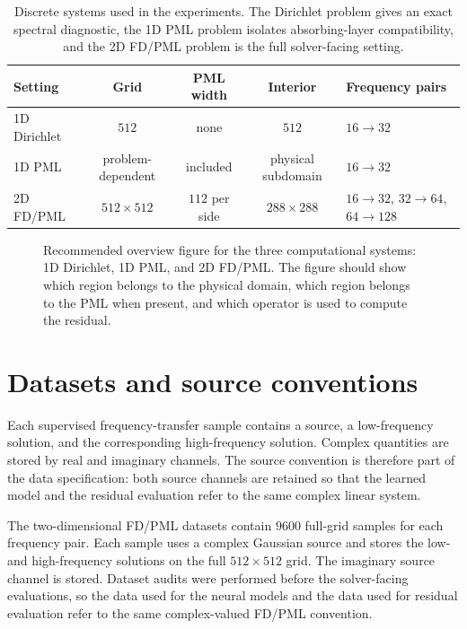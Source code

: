 \begin{table}[htbp]
\centering
\caption{Discrete systems used in the experiments. The Dirichlet problem gives
an exact spectral diagnostic, the 1D PML problem isolates absorbing-layer
compatibility, and the 2D FD/PML problem is the full solver-facing setting.}
\label{tab:setup-systems}
\begin{tabular}{lcccl}
\toprule
Setting & Grid & PML width & Interior & Frequency pairs \\
\midrule
1D Dirichlet & $512$ & none & $512$ & $16\to32$ \\
1D PML & problem-dependent & included & physical subdomain & $16\to32$ \\
2D FD/PML & $512\times512$ & $112$ per side & $288\times288$ &
$16\to32$, $32\to64$, $64\to128$ \\
\bottomrule
\end{tabular}
\end{table}

\begin{figure}[htbp]
    \centering
    \caption{Recommended overview figure for the three computational systems:
    1D Dirichlet, 1D PML, and 2D FD/PML. The figure should show which region
    belongs to the physical domain, which region belongs to the PML when
    present, and which operator is used to compute the residual.}
    \label{fig:setup-discrete-systems-overview}
\end{figure}

\section{Datasets and source conventions}
\label{sec:setup-datasets}

Each supervised frequency-transfer sample contains a source, a
low-frequency solution, and the corresponding high-frequency solution. Complex
quantities are stored by real and imaginary channels. The source convention is
therefore part of the data specification: both source channels are retained so
that the learned model and the residual evaluation refer to the same complex
linear system.

The two-dimensional FD/PML datasets contain $9600$ full-grid samples for each
frequency pair. Each sample uses a complex Gaussian source and stores the
low- and high-frequency solutions on the full $512\times512$ grid. The
imaginary source channel is stored. Dataset audits were performed before the
solver-facing evaluations, so the data used for the neural models and the
data used for residual evaluation refer to the same complex-valued FD/PML
convention.

